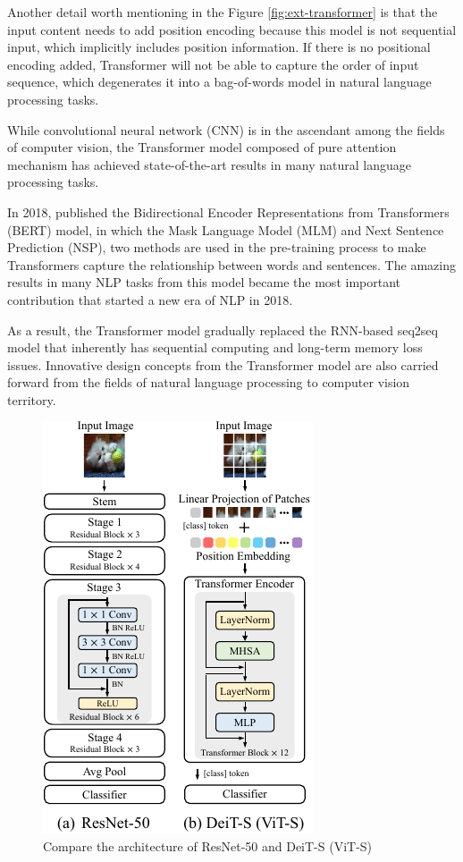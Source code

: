 Another detail worth mentioning in the Figure \ref{fig:ext-transformer} is that the input content needs to add position encoding because this model is not sequential input, which implicitly includes position information.
If there is no positional encoding added, Transformer will not be able to capture the order of input sequence, which degenerates it into a bag-of-words model in natural language processing tasks.

While convolutional neural network (CNN) is in the ascendant among the fields of computer vision, the Transformer model composed of pure attention mechanism has achieved state-of-the-art results in many natural language processing tasks.

In 2018, \citet{devlin2019bert} published the Bidirectional Encoder Representations from Transformers (BERT) model, in which the Mask Language Model (MLM) and Next Sentence Prediction (NSP), two methods are used in the pre-training process to make Transformers capture the relationship between words and sentences.
The amazing results in many NLP tasks from this model became the most important contribution that started a new era of NLP in 2018.

As a result, the Transformer model gradually replaced the RNN-based seq2seq model that inherently has sequential computing and long-term memory loss issues. Innovative design concepts from the Transformer model are also carried forward from the fields of natural language processing to computer vision territory.

\begin{figure}
    \vspace*{-1em}
    \includegraphics[width=.5\textwidth]{literature/imgs/ext-res50-deit-s.pdf}
    \caption{Compare the architecture of ResNet-50 and DeiT-S (ViT-S)\cite{guo2021cmt}}
    \label{fig:ext-res50-deit-s}
\end{figure}


